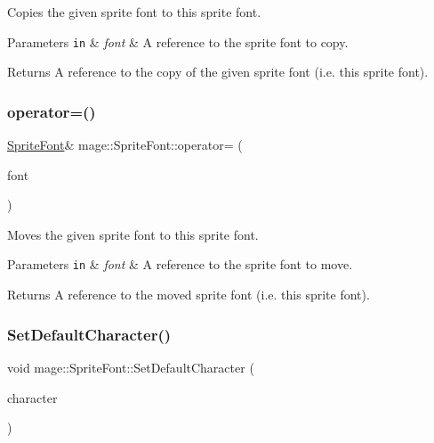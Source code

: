 Copies the given sprite font to this sprite font.


\begin{DoxyParams}[1]{Parameters}
\mbox{\tt in}  & {\em font} & A reference to the sprite font to copy. \\
\hline
\end{DoxyParams}
\begin{DoxyReturn}{Returns}
A reference to the copy of the given sprite font (i.\+e. this sprite font). 
\end{DoxyReturn}
\hypertarget{classmage_1_1_sprite_font_ab00b7f5c2740faf52ea778d94ae704bd}{}\label{classmage_1_1_sprite_font_ab00b7f5c2740faf52ea778d94ae704bd} 
\subsubsection{\texorpdfstring{operator=()}{operator=()}\hspace{0.1cm}{\footnotesize\ttfamily [2/2]}}
{\footnotesize\ttfamily \hyperlink{classmage_1_1_sprite_font}{Sprite\+Font}\& mage\+::\+Sprite\+Font\+::operator= (\begin{DoxyParamCaption}\item[{\hyperlink{classmage_1_1_sprite_font}{Sprite\+Font} \&\&}]{font }\end{DoxyParamCaption})\hspace{0.3cm}{\ttfamily [delete]}}

Moves the given sprite font to this sprite font.


\begin{DoxyParams}[1]{Parameters}
\mbox{\tt in}  & {\em font} & A reference to the sprite font to move. \\
\hline
\end{DoxyParams}
\begin{DoxyReturn}{Returns}
A reference to the moved sprite font (i.\+e. this sprite font). 
\end{DoxyReturn}
\hypertarget{classmage_1_1_sprite_font_a0b0feb25673d6f9d9e3215167800d817}{}\label{classmage_1_1_sprite_font_a0b0feb25673d6f9d9e3215167800d817} 
\subsubsection{\texorpdfstring{Set\+Default\+Character()}{SetDefaultCharacter()}}
{\footnotesize\ttfamily void mage\+::\+Sprite\+Font\+::\+Set\+Default\+Character (\begin{DoxyParamCaption}\item[{wchar\+\_\+t}]{character }\end{DoxyParamCaption})}

